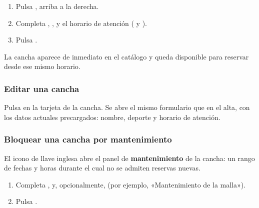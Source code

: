 \begin{enumerate}
  \item Pulsa , arriba a la derecha.
  \item Completa , , y el horario de atención
        ( y ).
  \item Pulsa .
\end{enumerate}


La cancha aparece de inmediato en el catálogo y queda disponible para
reservar desde ese mismo horario.


\subsubsection{Editar una cancha}

Pulsa  en la tarjeta de la cancha. Se abre el mismo
formulario que en el alta, con los datos actuales precargados: nombre,
deporte y horario de atención.



\subsubsection{Bloquear una cancha por mantenimiento}
\label{sec:admin:mantenimiento}

El icono de llave inglesa abre el panel de \textbf{mantenimiento} de la
cancha: un rango de fechas y horas durante el cual no se admiten reservas
nuevas.


\begin{enumerate}
  \item Completa ,  y, opcionalmente,
         (por ejemplo, «Mantenimiento de la malla»).
  \item Pulsa .
\end{enumerate}

